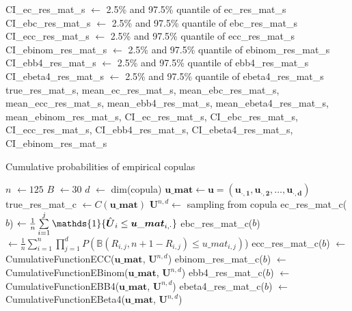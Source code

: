 \documentclass[12pt]{report}
\newcommand{\1}{\mathbf{1}}
\begin{document}
\begin{flushleft}
\begin{algorithm}[H]
\begin{algorithmic}
    \State CI\_ec\_res\_mat\_s $\gets$ 2.5\% and 97.5\% quantile of ec\_res\_mat\_s
    \State CI\_ebc\_res\_mat\_s $\gets$ 2.5\% and 97.5\% quantile of ebc\_res\_mat\_s
    \State CI\_ecc\_res\_mat\_s $\gets$ 2.5\% and 97.5\% quantile of ecc\_res\_mat\_s
    \State CI\_ebinom\_res\_mat\_s $\gets$ 2.5\% and 97.5\% quantile of ebinom\_res\_mat\_s
    \State CI\_ebb4\_res\_mat\_s $\gets$ 2.5\% and 97.5\% quantile of ebb4\_res\_mat\_s
    \State CI\_ebeta4\_res\_mat\_s $\gets$ 2.5\% and 97.5\% quantile of ebeta4\_res\_mat\_s
    \State \Return true\_res\_mat\_s, mean\_ec\_res\_mat\_s, mean\_ebc\_res\_mat\_s, mean\_ecc\_res\_mat\_s, mean\_ebb4\_res\_mat\_s, mean\_ebeta4\_res\_mat\_s, mean\_ebinom\_res\_mat\_s, CI\_ec\_res\_mat\_s, CI\_ebc\_res\_mat\_s, CI\_ecc\_res\_mat\_s, CI\_ebb4\_res\_mat\_s, CI\_ebeta4\_res\_mat\_s, CI\_ebinom\_res\_mat\_s
\EndProcedure
\end{algorithmic}
\end{algorithm}

\begin{algorithm}[H]
\caption{Cumulative probabilities of empirical copulas}
\begin{algorithmic}
 
    \State $n$ $\gets 125$
    \State $B$ $\gets 30$
    \State $d$ $\gets$ dim(copula)
    \State $\boldsymbol{u\_mat} \gets \boldsymbol{u} = (\boldsymbol{u_{\cdot,1}}, \boldsymbol{u_{\cdot,2}}, \dots, \boldsymbol{u_{\cdot,d}})$ 
    \State true\_res\_mat\_c $\gets C(\boldsymbol{u\_mat})$ 
        \State $\boldsymbol{U}^{n,d} \gets$ sampling from copula 
        \State ec\_res\_mat\_c($b$) $\gets \frac{1}{n} \sum\limits_{i = 1}^{j} \mathds{1}\{\Hat{\boldsymbol{U}}_{i} \le \boldsymbol{u\_mat}_{i,\cdot}\}$ 
        \State ebc\_res\_mat\_c($b$) $\gets \frac{1}{n}\sum\limits_{i = 1}^{n} \prod\limits_{j = 1}^{d} P(\mathbb{B}(R_{i,j}, n + 1 - R_{i,j}) \le u\_mat_{i,j})$)
        \State ecc\_res\_mat\_c($b$) $\gets$ CumulativeFunctionECC($\boldsymbol{u\_mat}$, $\boldsymbol{U}^{n,d}$)
        \State ebinom\_res\_mat\_c($b$) $\gets$ CumulativeFunctionEBinom($\mathbf{u\_mat}$, $\boldsymbol{U}^{n,d}$)
        \State ebb4\_res\_mat\_c($b$) $\gets$ CumulativeFunctionEBB4($\mathbf{u\_mat}$, $\boldsymbol{U}^{n,d}$)
        \State ebeta4\_res\_mat\_c($b$) $\gets$ CumulativeFunctionEBeta4($\mathbf{u\_mat}$, $\boldsymbol{U}^{n,d}$)


\end{algorithmic}
\end{algorithm}
\end{flushleft}
\end{document}
